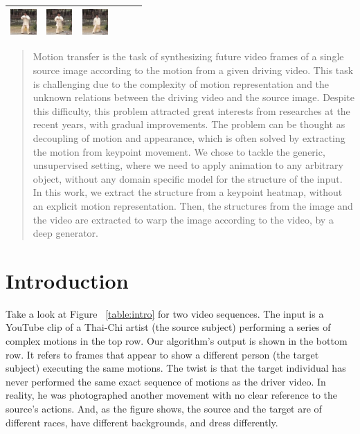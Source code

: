\documentclass{article}
\begin{document}
\begin{table}[t]
\begin{center}
\begin{small}
\begin{sc}
\begin{tabular}{m{1.0cm}m{1.0cm}m{1.0cm}m{1.0cm}m{1.0cm}m{1.0cm}}
\includegraphics[width=1cm, height=1cm]{images/intro_image/animate_4.png} &
\includegraphics[width=1cm, height=1cm]{images/intro_image/animate_5.png} &
\includegraphics[width=1cm, height=1cm]{images/intro_image/animate_6.png}\\
\bottomrule
\end{tabular}
\end{sc}
\end{small}
\end{center}
\vskip -0.1in
\end{table}

\begin{abstract}
Motion transfer is the task of synthesizing future video frames of a single
source image according to the motion from a given driving video.
This task is challenging due to the complexity of motion representation
and the unknown relations between the driving video and the source image.
Despite this difficulty, this problem attracted great interests from
researches at the recent years, with gradual improvements. The
problem can be thought as decoupling of motion and appearance, which is
often solved by extracting the motion from keypoint movement.
We chose to tackle the generic, unsupervised setting, where we need to apply
animation to any arbitrary object, without any domain specific model for the
structure of the input.
In this work, we extract the structure from a keypoint heatmap, without an
explicit motion representation. Then, the structures from the image and the video
are extracted to warp the image according to the video, by a deep
generator.
\end{abstract}

\section{Introduction}
Take a look at Figure ~\ref{table:intro} for two video sequences. The input
is a YouTube clip of a Thai-Chi artist (the source subject) performing a
series of complex motions in the top row. Our algorithm's output is shown in
the bottom row. It refers to frames that appear to show a different person
(the target subject) executing the same motions. The twist is that the
target individual has never performed the same exact sequence of motions as
the driver video. In reality, he was photographed another movement with no clear
reference to the source's actions.
And, as the figure shows, the source and the target are of different races,
have different backgrounds, and dress differently.
\end{document}
